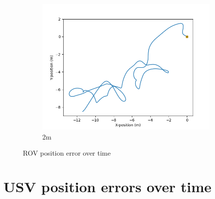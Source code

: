 \documentclass[class=article, crop=false]{standalone}
\begin{document}
\begin{figure}
\begin{subfigure}[b]{0.48\textwidth}
        \includegraphics{scenario1/rov-100m/2.0m/usv_position_controlled}
        \caption{2m}
        \label{}
    \end{subfigure}

    \caption{ROV position error over time}
\end{figure}

\section{USV position errors over time}
\end{document}
